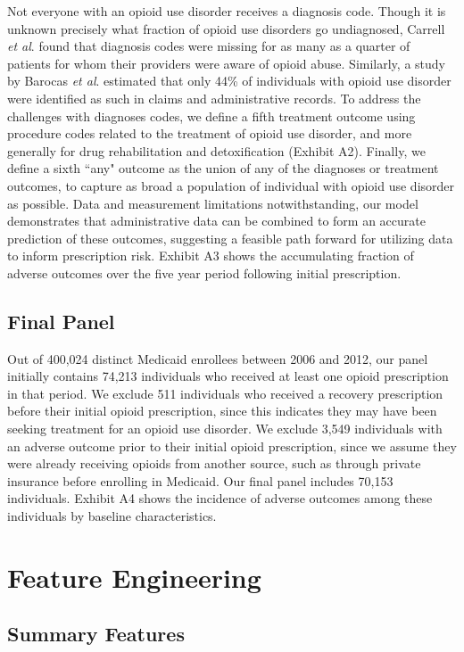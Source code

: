 \documentclass[11pt, letter]{article}
\begin{document}
Not everyone with an opioid use disorder receives a diagnosis code. Though it is unknown precisely what fraction of opioid use disorders go undiagnosed, Carrell {\em et al}. found that diagnosis codes were missing for as many as a quarter of patients for whom their providers were aware of opioid abuse. Similarly, a study by Barocas {\em et al}. estimated that only 44\% of individuals with opioid use disorder were identified as such in claims and administrative records. To address the challenges with diagnoses codes, we define a fifth treatment outcome using procedure codes related to the treatment of opioid use disorder, and more generally for drug rehabilitation and detoxification (Exhibit A2). Finally, we define a sixth ``any" outcome as the union of any of the diagnoses or treatment outcomes, to capture as broad a population of individual with opioid use disorder as possible. Data and measurement limitations notwithstanding, our model demonstrates that administrative data can be combined to form an accurate prediction of these outcomes, suggesting a feasible path forward for utilizing data to inform prescription risk. Exhibit A3 shows the accumulating fraction of adverse outcomes over the five year period following initial prescription.

\subsection{Final Panel}

Out of 400,024 distinct Medicaid enrollees between 2006 and 2012, our panel initially contains 74,213 individuals who received at least one opioid prescription in that period. We exclude 511 individuals who received a recovery prescription before their initial opioid prescription, since this indicates they may have been seeking treatment for an opioid use disorder. We exclude 3,549 individuals with an adverse outcome prior to their initial opioid prescription, since we assume they were already receiving opioids from another source, such as through private insurance before enrolling in Medicaid. Our final panel includes 70,153 individuals. Exhibit A4 shows the incidence of adverse outcomes among these individuals by baseline characteristics.

\section{Feature Engineering}

\subsection{Summary Features}
\end{document}
